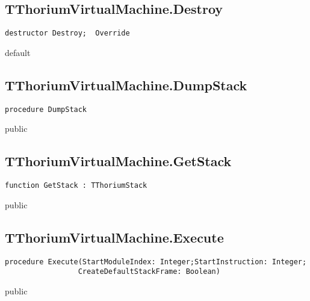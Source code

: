 \subsection{TThoriumVirtualMachine.Destroy}
\label{thoriumcore:thorium:tthoriumvirtualmachine:destroy}
\begin{FPCList}
\Synopsis
\Declaration 

\begin{verbatim}
destructor Destroy;  Override
\end{verbatim}
\Visibility
default
\Description
\Errors
\end{FPCList}
\subsection{TThoriumVirtualMachine.DumpStack}
\label{thoriumcore:thorium:tthoriumvirtualmachine:dumpstack}
\begin{FPCList}
\Synopsis
\Declaration 

\begin{verbatim}
procedure DumpStack
\end{verbatim}
\Visibility
public
\Description
\Errors
\end{FPCList}
\subsection{TThoriumVirtualMachine.GetStack}
\label{thoriumcore:thorium:tthoriumvirtualmachine:getstack}
\begin{FPCList}
\Synopsis
\Declaration 

\begin{verbatim}
function GetStack : TThoriumStack
\end{verbatim}
\Visibility
public
\Description
\Errors
\end{FPCList}
\subsection{TThoriumVirtualMachine.Execute}
\label{thoriumcore:thorium:tthoriumvirtualmachine:execute}
\begin{FPCList}
\Synopsis
\Declaration 

\begin{verbatim}
procedure Execute(StartModuleIndex: Integer;StartInstruction: Integer;
                 CreateDefaultStackFrame: Boolean)
\end{verbatim}
\Visibility
public
\Description
\Errors
\end{FPCList}
